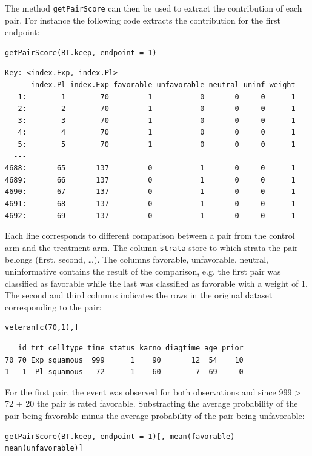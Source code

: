 \documentclass[12pt]{article}
\begin{document}
The method \texttt{getPairScore} can then be used to extract the contribution
of each pair. For instance the following code extracts the
contribution for the first endpoint:
\lstset{language=r,label= ,caption= ,captionpos=b,numbers=none}
\begin{lstlisting}
getPairScore(BT.keep, endpoint = 1)
\end{lstlisting}

\begin{verbatim}
Key: <index.Exp, index.Pl>
      index.Pl index.Exp favorable unfavorable neutral uninf weight
   1:        1        70         1           0       0     0      1
   2:        2        70         1           0       0     0      1
   3:        3        70         1           0       0     0      1
   4:        4        70         1           0       0     0      1
   5:        5        70         1           0       0     0      1
  ---                                                              
4688:       65       137         0           1       0     0      1
4689:       66       137         0           1       0     0      1
4690:       67       137         0           1       0     0      1
4691:       68       137         0           1       0     0      1
4692:       69       137         0           1       0     0      1
\end{verbatim}

Each line corresponds to different comparison between a pair from the
control arm and the treatment arm. The column \texttt{strata} store to which
strata the pair belongs (first, second, \ldots{}). The columns favorable,
unfavorable, neutral, uninformative contains the result of the
comparison, e.g. the first pair was classified as favorable while the
last was classified as favorable with a weight of 1. The second and
third columns indicates the rows in the original dataset corresponding
to the pair:
\lstset{language=r,label= ,caption= ,captionpos=b,numbers=none}
\begin{lstlisting}
veteran[c(70,1),]
\end{lstlisting}

\begin{verbatim}
   id trt celltype time status karno diagtime age prior
70 70 Exp squamous  999      1    90       12  54    10
1   1  Pl squamous   72      1    60        7  69     0
\end{verbatim}



For the first pair, the event was observed for both observations and
since 999 > 72 + 20 the pair is rated favorable. Substracting the
average probability of the pair being favorable minus the average
probability of the pair being unfavorable:
\lstset{language=r,label= ,caption= ,captionpos=b,numbers=none}
\begin{lstlisting}
getPairScore(BT.keep, endpoint = 1)[, mean(favorable) - mean(unfavorable)]
\end{lstlisting}
\end{document}
